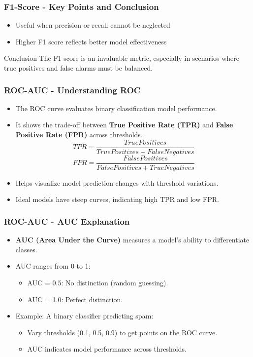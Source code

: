 \documentclass[aspectratio=169]{beamer}
\begin{document}
\begin{frame}[fragile]
    \frametitle{F1-Score - Key Points and Conclusion}
    \begin{itemize}
        \item Useful when precision or recall cannot be neglected
        \item Higher F1 score reflects better model effectiveness
    \end{itemize}
    \begin{block}{Conclusion}
        The F1-score is an invaluable metric, especially in scenarios where true positives and false alarms must be balanced.
    \end{block}
\end{frame}

\begin{frame}[fragile]
    \frametitle{ROC-AUC - Understanding ROC}
    \begin{itemize}
        \item The ROC curve evaluates binary classification model performance.
        \item It shows the trade-off between \textbf{True Positive Rate (TPR)} and \textbf{False Positive Rate (FPR)} across thresholds.
        \begin{equation}
            TPR = \frac{True Positives}{True Positives + False Negatives}
        \end{equation}
        \begin{equation}
            FPR = \frac{False Positives}{False Positives + True Negatives}
        \end{equation}
        \item Helps visualize model prediction changes with threshold variations.
        \item Ideal models have steep curves, indicating high TPR and low FPR.
    \end{itemize}
\end{frame}

\begin{frame}[fragile]
    \frametitle{ROC-AUC - AUC Explanation}
    \begin{itemize}
        \item \textbf{AUC (Area Under the Curve)} measures a model’s ability to differentiate classes.
        \item AUC ranges from 0 to 1:
            \begin{itemize}
                \item AUC = 0.5: No distinction (random guessing).
                \item AUC = 1.0: Perfect distinction.
            \end{itemize}
        \item Example: A binary classifier predicting spam:
            \begin{itemize}
                \item Vary thresholds (0.1, 0.5, 0.9) to get points on the ROC curve.
                \item AUC indicates model performance across thresholds.
            \end{itemize}
    \end{itemize}
\end{frame}
\end{document}
